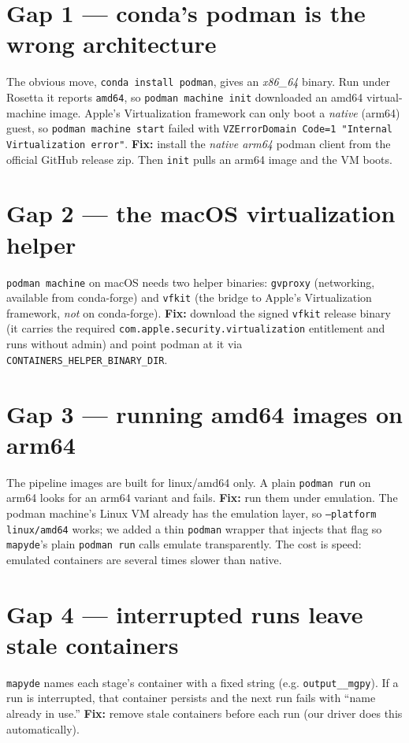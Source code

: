 \documentclass[11pt,oneside]{report}
\newcommand{\code}[1]{\texttt{#1}}
\begin{document}
\section{Gap 1 --- conda's podman is the wrong architecture}
The obvious move, \code{conda install podman}, gives an \emph{x86\_64} binary. Run under Rosetta it
reports \code{amd64}, so \code{podman machine init} downloaded an amd64 virtual-machine image. Apple's
Virtualization framework can only boot a \emph{native} (arm64) guest, so \code{podman machine start}
failed with \code{VZErrorDomain Code=1 "Internal Virtualization error"}.
\textbf{Fix:} install the \emph{native arm64} podman client from the official GitHub release zip.
Then \code{init} pulls an arm64 image and the VM boots.

\section{Gap 2 --- the macOS virtualization helper}
\code{podman machine} on macOS needs two helper binaries: \code{gvproxy} (networking, available from
conda-forge) and \code{vfkit} (the bridge to Apple's Virtualization framework, \emph{not} on
conda-forge). \textbf{Fix:} download the signed \code{vfkit} release binary (it carries the required
\code{com.apple.security.virtualization} entitlement and runs without admin) and point podman at it
via \code{CONTAINERS\_HELPER\_BINARY\_DIR}.

\section{Gap 3 --- running amd64 images on arm64}
The pipeline images are built for linux/amd64 only. A plain \code{podman run} on arm64 looks for an
arm64 variant and fails. \textbf{Fix:} run them under emulation. The podman machine's Linux VM
already has the emulation layer, so \code{--platform linux/amd64} works; we added a thin \code{podman}
wrapper that injects that flag so \code{mapyde}'s plain \code{podman run} calls emulate transparently.
The cost is speed: emulated containers are several times slower than native.

\section{Gap 4 --- interrupted runs leave stale containers}
\code{mapyde} names each stage's container with a fixed string (e.g. \code{output\_\_mgpy}). If a run
is interrupted, that container persists and the next run fails with ``name already in use.''
\textbf{Fix:} remove stale containers before each run (our driver does this automatically).
\end{document}
